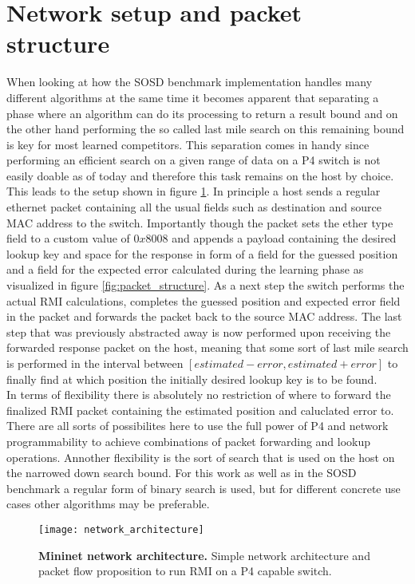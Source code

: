 \section{Network setup and packet structure}
\label{sect:rmionbmv2:network}
When looking at how the SOSD benchmark implementation handles many different algorithms at the same time it becomes apparent that separating a phase where an algorithm can do its processing to return a result bound and on the other hand performing the so called last mile search on this remaining bound is key for most learned competitors. This separation comes in handy since performing an efficient search on a given range of data on a P4 switch is not easily doable as of today and therefore this task remains on the host by choice. This leads to the setup shown in figure \ref{fig:network_architecture}. In principle a host sends a regular ethernet packet containing all the usual fields such as destination and source MAC address to the switch. Importantly though the packet sets the ether type field to a custom value of $0x8008$ and appends a payload containing the desired lookup key and space for the response in form of a field for the guessed position and a field for the expected error calculated during the learning phase as visualized in figure  \ref{fig:packet_structure}. As a next step the switch performs the actual RMI calculations, completes the guessed position and expected error field in the packet and forwards the packet back to the source MAC address. The last step that was previously abstracted away is now performed upon receiving the forwarded response packet on the host, meaning that some sort of last mile search is performed in the interval between \([estimated - error, estimated + error]\) to finally find at which position the initially desired lookup key is to be found.\\

In terms of flexibility there is absolutely no restriction of where to forward the finalized RMI packet containing the estimated position and caluclated error to. There are all sorts of possibilites here to use the full power of P4 and network programmability to achieve combinations of packet forwarding and lookup operations. Annother flexibility is the sort of search that is used on the host on the narrowed down search bound. For this work as well as in the SOSD benchmark a regular form of binary search is used, but for different concrete use cases other algorithms may be preferable.

\begin{figure}[ht]
  \centering
  \texttt{[image: network\_architecture]}
  \caption[Network architecture]{
    \textbf{Mininet network architecture.} Simple network architecture and packet flow proposition to run RMI on a P4 capable switch.
  }
  \label{fig:network_architecture}
\end{figure}

